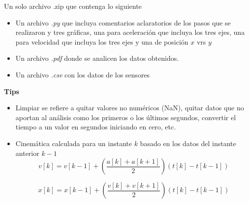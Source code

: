 \documentclass[12pt]{article}
\begin{document}
Un solo archivo .zip que contenga lo siguiente
\begin{itemize}
    \item Un archivo \emph{.py} que incluya comentarios aclaratorios de los pasos que se realizaron y tres gráficas, una para aceleración que incluya los tres ejes, una para velocidad que incluya los tres ejes y una de posición $x$ vrs $y$
    \item Un archivo \emph{.pdf} donde se analicen los datos obtenidos.
    \item Un archivo \emph{.csv} con los datos de los sensores
\end{itemize}

\noindent\textbf{Tips}
\begin{itemize}
    \item Limpiar se refiere a quitar valores no numéricos (NaN), quitar datos que no aportan al análisis como los primeros o los últimos segundos, convertir el tiempo a un valor en segundos iniciando en cero, etc.
    \item Cinemática calculada para un instante $k$ basado en los datos del instante anterior $k-1$
    \begin{equation*}
        v[k] = v[k-1] + \left(\dfrac{a[k]+a[k+1]}{2}\right)(t[k] - t[k-1])
    \end{equation*}
    
    \begin{equation*}
        x[k] = x[k-1] + \left(\dfrac{v[k]+v[k+1]}{2}\right)(t[k] - t[k-1])
    \end{equation*}
\end{itemize}

% 
% 
\end{document}
